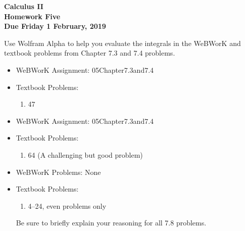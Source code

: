 \documentclass[12pt]{article}
\begin{document}
\pagestyle{empty}
 
\begin{center}
{\large {\bf Calculus II}}\\
\medskip
{\large {\bf Homework Five}}\\
\medskip
{ {\bf Due Friday 1 February, 2019}}\\
\end{center}


\noindent Use Wolfram Alpha to help you evaluate the integrals in the
WeBWorK and textbook problems from  Chapter 7.3 and 7.4 problems.


\begin{itemize}
  \item WeBWorK Assignment: 05Chapter7.3and7.4
  \item Textbook Problems:
    \begin{enumerate}
    \setlength{\itemsep}{-1mm}
    \item 47
\end{enumerate}
\end{itemize}


\begin{itemize}
  \item WeBWorK Assignment: 05Chapter7.3and7.4
  \item Textbook Problems:
    \begin{enumerate}
    \setlength{\itemsep}{-1mm}
    \item 64 (A challenging but good problem)
\end{enumerate}
\end{itemize}




\begin{itemize}
  \item WeBWorK Problems: None
  \item Textbook Problems:
\begin{enumerate}
\setlength{\itemsep}{-1mm}
  \item 4--24, even problems only
\end{enumerate}
Be sure to briefly explain your reasoning for all 7.8 problems.
\end{itemize}








\end{document}
